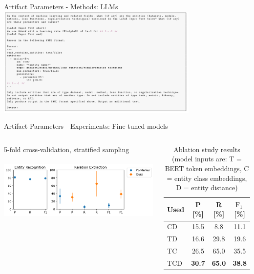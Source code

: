 \documentclass[en,16:9,smallfoot]{sdqbeamer}
\begin{document}
   \begin{frame}{Artifact Parameters - Methods: LLMs}
       \centering
       \includegraphics[width=0.75\textwidth]{imgs/prompt}
   \end{frame}

   \begin{frame}{Artifact Parameters - Experiments: Fine-tuned models}
   \begin{columns}
          5-fold cross-validation, stratified sampling\\
          ‌\\
           \includegraphics[width=\linewidth]{imgs/fine_tuned_eval}
        \begin{table}
          \centering
          \caption[Ablation study results]{Ablation study results (model inputs are: T = BERT token embeddings, C = entity class embeddings, D = entity distance)}
          \label{tab:finetunedablation}
          \begin{tabular}{lccc}
            \hline
            Used & P [\%] & R [\%] & $\text{F}_1$\,[\%] \\
            \hline
            \textvisiblespace CD & 15.5 & 8.8 & 11.1 \\
            T\textvisiblespace D & 16.6 & 29.8 & 19.6 \\
            TC\textvisiblespace & 26.5 & 65.0 & 35.5 \\
            TCD & \textbf{30.7} & \textbf{65.0} & \textbf{38.8} \\
            \hline
          \end{tabular}
        \end{table}
   \end{columns}
   \end{frame}
\end{document}
